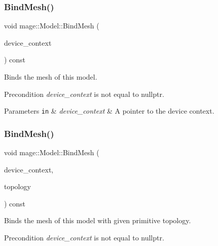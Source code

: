 \subsubsection{\texorpdfstring{Bind\+Mesh()}{BindMesh()}\hspace{0.1cm}{\footnotesize\ttfamily [1/2]}}
{\footnotesize\ttfamily void mage\+::\+Model\+::\+Bind\+Mesh (\begin{DoxyParamCaption}\item[{I\+D3\+D11\+Device\+Context4 $\ast$}]{device\+\_\+context }\end{DoxyParamCaption}) const\hspace{0.3cm}{\ttfamily [noexcept]}}

Binds the mesh of this model.

\begin{DoxyPrecond}{Precondition}
{\itshape device\+\_\+context} is not equal to {\ttfamily nullptr}. 
\end{DoxyPrecond}

\begin{DoxyParams}[1]{Parameters}
\mbox{\tt in}  & {\em device\+\_\+context} & A pointer to the device context. \\
\hline
\end{DoxyParams}
\hypertarget{classmage_1_1_model_a3eb8cec219dd224e302f832690324e14}{}\label{classmage_1_1_model_a3eb8cec219dd224e302f832690324e14} 
\subsubsection{\texorpdfstring{Bind\+Mesh()}{BindMesh()}\hspace{0.1cm}{\footnotesize\ttfamily [2/2]}}
{\footnotesize\ttfamily void mage\+::\+Model\+::\+Bind\+Mesh (\begin{DoxyParamCaption}\item[{I\+D3\+D11\+Device\+Context4 $\ast$}]{device\+\_\+context,  }\item[{D3\+D11\+\_\+\+P\+R\+I\+M\+I\+T\+I\+V\+E\+\_\+\+T\+O\+P\+O\+L\+O\+GY}]{topology }\end{DoxyParamCaption}) const\hspace{0.3cm}{\ttfamily [noexcept]}}

Binds the mesh of this model with given primitive topology.

\begin{DoxyPrecond}{Precondition}
{\itshape device\+\_\+context} is not equal to {\ttfamily nullptr}. 
\end{DoxyPrecond}

